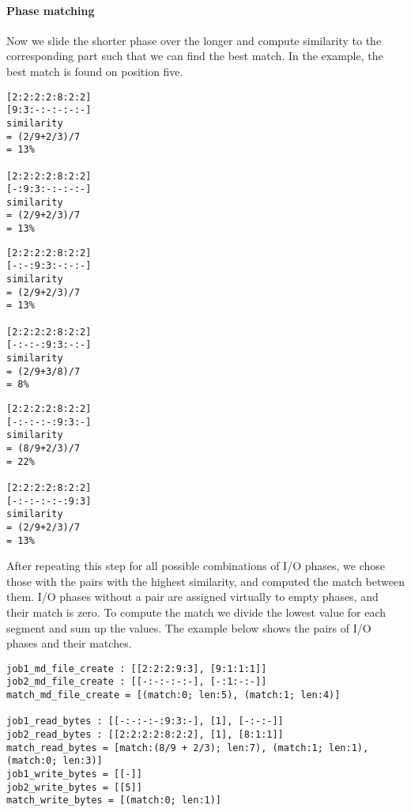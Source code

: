 \documentclass{jhps}
\begin{document}
\paragraph{Phase matching}
Now we slide the shorter phase over the longer and compute similarity to the corresponding part such that we can find the best match.
In the example, the best match is found on position five.

\noindent\begin{minipage}{0.33\textwidth}
\begin{lstlisting}
[2:2:2:2:8:2:2]
[9:3:-:-:-:-:-]
similarity
= (2/9+2/3)/7
= 13%

[2:2:2:2:8:2:2]
[-:9:3:-:-:-:-]
similarity
= (2/9+2/3)/7
= 13%
\end{lstlisting}
\end{minipage}
%
\noindent\begin{minipage}{0.33\textwidth}
\begin{lstlisting}
[2:2:2:2:8:2:2]
[-:-:9:3:-:-:-]
similarity
= (2/9+2/3)/7
= 13%

[2:2:2:2:8:2:2]
[-:-:-:9:3:-:-]
similarity
= (2/9+3/8)/7
= 8%
\end{lstlisting}
\end{minipage}
%
\noindent\begin{minipage}{0.33\textwidth}
\begin{lstlisting}
[2:2:2:2:8:2:2]
[-:-:-:-:9:3:-]
similarity
= (8/9+2/3)/7
= 22%

[2:2:2:2:8:2:2]
[-:-:-:-:-:9:3]
similarity
= (2/9+2/3)/7
= 13%
\end{lstlisting}
\end{minipage}

After repeating this step for all possible combinations of I/O phases, we chose those with the pairs with the highest similarity, and computed the match between them.
I/O phases without a pair are assigned virtually to empty phases, and their match is zero.
To compute the match we divide the lowest value for each segment and sum up the values.
The example below shows the pairs of I/O phases and their matches.

\begin{lstlisting}
job1_md_file_create : [[2:2:2:9:3], [9:1:1:1]]
job2_md_file_create : [[-:-:-:-:-], [-:1:-:-]]
match_md_file_create = [(match:0; len:5), (match:1; len:4)]

job1_read_bytes : [[-:-:-:-:9:3:-], [1], [-:-:-]]
job2_read_bytes : [[2:2:2:2:8:2:2], [1], [8:1:1]]
match_read_bytes = [match:(8/9 + 2/3); len:7), (match:1; len:1), (match:0; len:3)]
job1_write_bytes = [[-]]
job2_write_bytes = [[5]]
match_write_bytes = [(match:0; len:1)]
\end{lstlisting}
\end{document}
